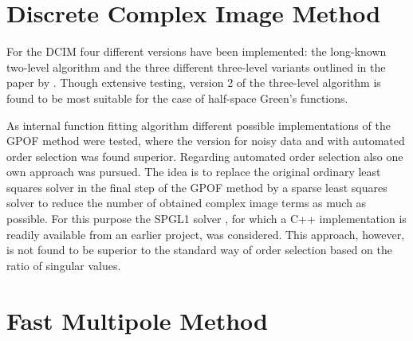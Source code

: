 \section{Discrete Complex Image Method}

For the \ac{DCIM} four different versions have been implemented: the
long-known two-level algorithm \cite{Aksun1996} and the three different
three-level variants outlined in the paper by \cite{Alparslan2010}.
Though extensive testing, version 2 of the three-level algorithm is found to
be most suitable for the case of half-space Green's functions.

As internal function fitting algorithm different possible implementations
of the \ac{GPOF} method \cite{Hua1989,Sarkar1995} were tested, where the
version for noisy data and with automated order selection was found superior.
Regarding automated order selection also one own approach was pursued.
The idea is to replace the original ordinary least squares solver in the final
step of the \ac{GPOF} method by a sparse least squares solver to reduce the 
number of obtained complex image terms as much as possible.
For this purpose the SPGL1 solver \cite{vandenberg2008, spgl1site}, for which a
C++ implementation is readily available from an earlier project, was considered.
This approach, however, is not found to be superior to the standard way of
order selection based on the ratio of singular values.







\section{Fast Multipole Method}


